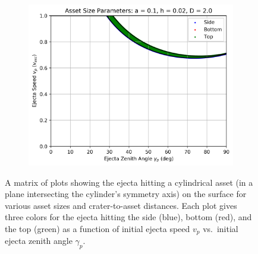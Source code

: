 \documentclass{article}
\begin{document}
\begin{figure}
	\begin{subfigure}[t]{.32\textwidth}
		\centering
		\includegraphics[width=.98\linewidth]{asset_speed_zenith_plot_1.000e-01_2.000e-02_2.000e+00.png}  
		\label{fig:sub-asset_speed_zenith_12}
	\end{subfigure}
	
	\caption{A matrix of plots showing the ejecta hitting a cylindrical asset (in a plane intersecting the cylinder's symmetry axis) on the surface for various asset sizes and crater-to-asset distances. Each plot gives three colors for the ejecta hitting the side (blue), bottom (red), and the top (green) as a function of initial ejecta speed $v_p$ vs.\ initial ejecta zenith angle $\gamma_p$.}
	\label{fig:asset_speed_zenith_comparison}
\end{figure}
\end{document}
